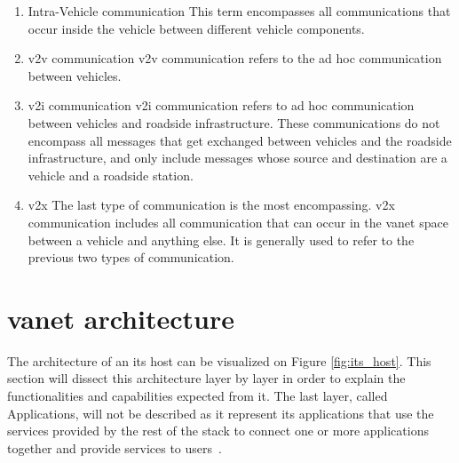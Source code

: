 \begin{enumerate}
	\item Intra-Vehicle communication
    This term encompasses all communications that occur inside the vehicle between different vehicle components.
	\item \gls{v2v} communication
    \gls{v2v} communication refers to the ad hoc communication between vehicles.

	\item \gls{v2i} communication
    \gls{v2i} communication refers to ad hoc communication between vehicles and roadside infrastructure. These communications do not encompass all messages that get exchanged between vehicles and the roadside infrastructure, and only include messages whose source and destination are a vehicle and a roadside station.

	\item \gls{v2x}
    The last type of communication is the most encompassing. \gls{v2x} communication includes all communication that can occur in the \gls{vanet} space between a vehicle and anything else. It is generally used to refer to the previous two types of communication.

\end{enumerate}


\section[VANET architecture]{\gls{vanet} architecture}
\label{sec:vanet_arch}

The architecture of an \gls{its} host can be visualized on Figure \ref{fig:its_host}. This section will dissect this architecture layer by layer in order to explain the functionalities and capabilities expected from it. The last layer, called Applications, will not be described as it represent \gls{its} applications that use the services provided by the rest of the stack to connect one or more applications together and provide services to users~\cite{etsi_intelligent_2010}.

